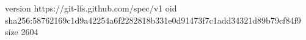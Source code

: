 version https://git-lfs.github.com/spec/v1
oid sha256:58762169c1d9a42254a6f2282818b331e0d91473f7c1add34321d89b79cf84f9
size 2604
